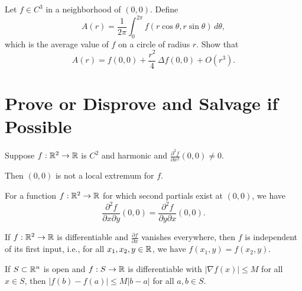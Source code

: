 \documentclass{homework}
\begin{document}
\begin{problem}\label{harmonic-averaging}%
Let $f\in C^3$ in a neighborhood of $(0,0)$. Define
\[
A(r)=\frac{1}{2\pi}\int_0^{2\pi} f(r\cos\theta,r\sin\theta)\,d\theta,
\]
which is the average value of $f$ on a circle of radius $r$. Show that
\[
  A(r)=f(0,0)+\frac{r^2}{4}\,\Delta f(0,0)+O(r^3).
\]
\end{problem}

\section{Prove or Disprove and Salvage if Possible}

\begin{problem}
  Suppose $f:\mathbb{R}^2\to\mathbb{R}$ is $C^2$ and harmonic and $\displaystyle\frac{\partial^2 f}{\partial x^2}(0,0)\neq 0$.

  Then $(0,0)$ is not a local extremum for $f$.
\end{problem}

\begin{problem}
  For a function $f:\mathbb{R}^2\to\mathbb{R}$ for which second partials exist at $(0,0)$, we have
  \[
    \frac{\partial^2 f}{\partial x \partial y}(0,0)=\frac{\partial^2 f}{\partial y \partial x}(0,0).
  \]
\end{problem}

\begin{problem}
If $f:\mathbb{R}^2\to\mathbb{R}$ is differentiable and $\displaystyle\frac{\partial f}{\partial x}$ vanishes everywhere, then $f$ is independent of its first input, i.e., for all $x_1,x_2,y\in\mathbb{R}$, we have $f(x_1,y)=f(x_2,y)$.
\end{problem}

\begin{problem}
If $S\subset \mathbb{R}^n$ is open and $f:S\to\mathbb{R}$ is differentiable with $|\nabla f(x)|\le M$ for all $x\in S$, then
\(
|f(b)-f(a)|\le M|b-a|
\)
for all \(a,b\in S\).
\end{problem}
\end{document}

